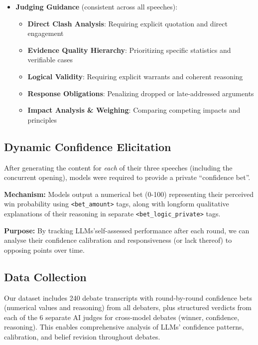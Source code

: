 \documentclass{article}
\begin{document}
\begin{itemize}
 \item \textbf{Judging Guidance} (consistent across all speeches):
 \begin{itemize}
   \item \textbf{Direct Clash Analysis}: Requiring explicit quotation and direct engagement
   \item \textbf{Evidence Quality Hierarchy}: Prioritizing specific statistics and verifiable cases
   \item \textbf{Logical Validity}: Requiring explicit warrants and coherent reasoning
   \item \textbf{Response Obligations}: Penalizing dropped or late-addressed arguments
   \item \textbf{Impact Analysis \& Weighing}: Comparing competing impacts and principles
 \end{itemize}
\end{itemize}

\subsection{Dynamic Confidence Elicitation}
\label{subsec:confidence_elicitation}

After generating the content for \textit{each} of their three speeches (including the concurrent opening), models were required to provide a private ``confidence bet''.

\textbf{Mechanism:} Models output a numerical bet (0-100) representing their perceived win probability using \texttt{\textless bet\_amount\textgreater} tags, along with longform qualitative explanations of their reasoning in separate \texttt{\textless bet\_logic\_private\textgreater} tags.

\textbf{Purpose:} By tracking LLMs'self-assessed performance after each round, we can analyse their confidence calibration and responsiveness (or lack thereof) to opposing points over time.

\subsection{Data Collection}
\label{subsec:data_collection}
Our dataset includes 240 debate transcripts with round-by-round confidence bets (numerical values and reasoning) from all debaters, plus structured verdicts from each of the 6 separate AI judges for cross-model debates (winner, confidence, reasoning). This enables comprehensive analysis of LLMs' confidence patterns, calibration, and belief revision throughout debates.
\end{document}
